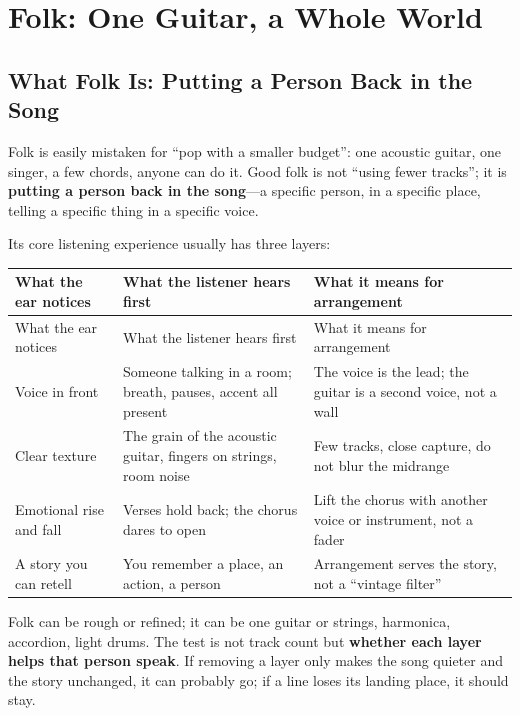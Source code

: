 \chapter{Folk: One Guitar, a Whole World}
\label{ch:genre-folk-deep}


\section{What Folk Is: Putting a Person Back in the Song}
\label{sec:folk-what}

Folk is easily mistaken for ``pop with a smaller budget'': one acoustic guitar, one singer, a few chords, anyone can do it. Good folk is not ``using fewer tracks''; it is \textbf{putting a person back in the song}---a specific person, in a specific place, telling a specific thing in a specific voice.

Its core listening experience usually has three layers:

\begin{longtable}{p{}p{}p{}}
\toprule
What the ear notices & What the listener hears first & What it means for arrangement \\
\midrule
\endfirsthead
\toprule
What the ear notices & What the listener hears first & What it means for arrangement \\
\midrule
\endhead
Voice in front & Someone talking in a room; breath, pauses, accent all present & The voice is the lead; the guitar is a second voice, not a wall \\
Clear texture & The grain of the acoustic guitar, fingers on strings, room noise & Few tracks, close capture, do not blur the midrange \\
Emotional rise and fall & Verses hold back; the chorus dares to open & Lift the chorus with another voice or instrument, not a fader \\
A story you can retell & You remember a place, an action, a person & Arrangement serves the story, not a ``vintage filter'' \\
\bottomrule
\end{longtable}

Folk can be rough or refined; it can be one guitar or strings, harmonica, accordion, light drums. The test is not track count but \textbf{whether each layer helps that person speak}. If removing a layer only makes the song quieter and the story unchanged, it can probably go; if a line loses its landing place, it should stay.

